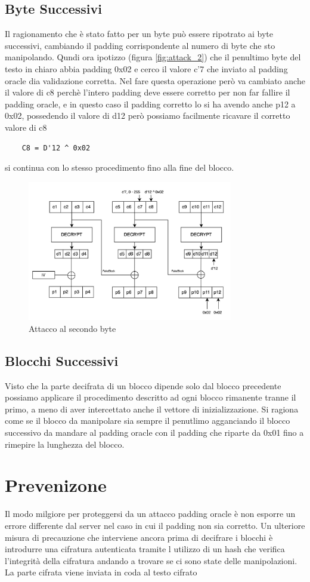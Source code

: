 \subsection{Byte Successivi}
Il ragionamento che è stato fatto per un byte può essere ripotrato ai byte successivi, cambiando il padding corrispondente al numero di byte che sto manipolando.
Qundi  ora ipotizzo (figura \ref{fig:attack_2}) che il penultimo byte del testo in chiaro abbia padding 0x02 e cerco il valore c'7 che inviato al padding oracle dia validazione corretta.
Nel fare questa operazione però va cambiato anche il valore di c8 perchè l'intero padding deve essere corretto per non far fallire il padding oracle, e in questo caso il padding corretto lo 
si ha avendo anche p12 a 0x02, possedendo il valore di d12 però possiamo facilmente ricavare il corretto valore di c8
\begin{verbatim}
    C8 = D'12 ^ 0x02
 \end{verbatim}
 si continua con lo stesso procedimento fino alla fine del blocco.
\begin{figure}[h!]
    \includegraphics[width=0.8\textwidth]{img/attack_second_byte.jpeg}
    \centering
    \caption{Attacco al secondo byte}
    \label{fig:attack_3}
\end{figure}
\subsection{Blocchi Successivi}
Visto che la parte decifrata di un blocco dipende solo dal blocco precedente possiamo applicare il procedimento descritto ad ogni blocco rimanente tranne il primo, a meno di aver intercettato anche il vettore di inizializzazione.
Si ragiona come se il blocco da manipolare sia sempre il penutlimo agganciando il blocco successivo da mandare al padding oracle con il padding che riparte da 0x01 fino a rimepire la lunghezza del blocco.
\section{Prevenizone}
Il modo milgiore per proteggersi da un attacco padding oracle è non esporre un errore differente dal server nel caso in cui il padding non sia corretto.
Un ulteriore misura di precauzione che interviene ancora prima di decifrare i blocchi è introdurre una cifratura autenticata tramite l utilizzo di un hash che verifica l'integrità della cifratura andando a trovare se ci sono state delle manipolazioni. La parte cifrata viene inviata in coda al testo cifrato